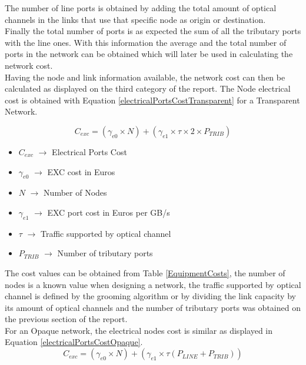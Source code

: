 	The number of line ports is obtained by adding the total amount of optical channels in the links that use that specific node as origin or destination.\\
	
	Finally the total number of ports is as expected the sum of all the tributary ports with the line ones. With this information the average and the total number of ports in the network can be obtained which will later be used in calculating the network cost.\\
	
	Having the node and link information available, the network cost can then be calculated as displayed on the third category of the report.								
	The Node electrical cost is obtained with Equation \ref{electricalPortsCostTransparent} for a Transparent Network.
	
	\begin{equation}
		C_{exc} = \left(\gamma_{e0}\times N\right) + \left(\gamma_{e1} \times \tau \times 2 \times P_{TRIB}\right)
		\label{electricalPortsCostTransparent}
	\end{equation}
	
	\begin{itemize}
		\item{$C_{exc}$		$\rightarrow$	Electrical Ports Cost}
		\item{$\gamma_{e0}$	$\rightarrow$	EXC cost in Euros}
		\item{$N$			$\rightarrow$	Number of Nodes}
		\item{$\gamma_{e1}$	$\rightarrow$	EXC port cost in Euros per GB/s}
		\item{$\tau$		$\rightarrow$	Traffic supported by optical channel}
		\item{$P_{TRIB}$	$\rightarrow$	Number of tributary ports}
	\end{itemize}
	
	The cost values can be obtained from Table \ref{EquipmentCosts}, the number of nodes is a known value when designing a network, the traffic supported by optical channel is defined by the grooming algorithm or by dividing the link capacity by its amount of optical channels and the number of tributary ports was obtained on the previous section of the report. \\
	
	For an Opaque network, the electrical nodes cost is similar as displayed in Equation \ref{electricalPortsCostOpaque}.\\
	
	\begin{equation}
	C_{exc} = \left(\gamma_{e0}\times N\right) + \left(\gamma_{e1} \times \tau \left(P_{LINE} + P_{TRIB}\right)\right)
	\label{electricalPortsCostOpaque}
	\end{equation}	\\
	
